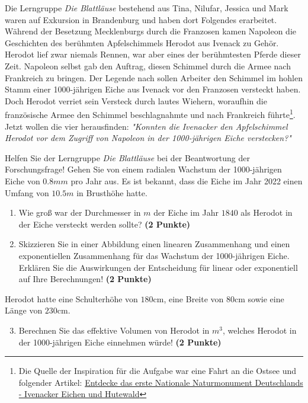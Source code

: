 \documentclass[a4paper, 9pt]{scrartcl}\usepackage[]{graphicx}\usepackage[]{xcolor}
\begin{document}
Die Lerngruppe \textit{Die Blattläuse} bestehend aus Tina, Nilufar, Jessica und Mark waren auf Exkursion in Brandenburg und haben dort Folgendes erarbeitet. Während der Besetzung Mecklenburgs durch die Franzosen kamen Napoleon die Geschichten des berühmten Apfelschimmels Herodot aus Ivenack zu Gehör. Herodot lief zwar niemals Rennen, war aber eines der berühmtesten Pferde dieser Zeit. Napoleon selbst gab den Auftrag, diesen Schimmel durch die Armee nach Frankreich zu bringen. Der Legende nach sollen Arbeiter den Schimmel im hohlen Stamm einer 1000-jährigen Eiche aus Ivenack vor den Franzosen versteckt haben. Doch Herodot verriet sein Versteck durch lautes Wiehern, woraufhin die französische Armee den Schimmel beschlagnahmte und nach Frankreich führte\footnote{Die Quelle der Inspiration  für die Aufgabe war eine Fahrt an die Ostsee und folgender Artikel:
  \href{https://www.wald-mv.de/landingpage/ivenacker-eichen/}{Entdecke das erste Nationale Naturmonument Deutschlands - Ivenacker Eichen und Hutewald}}. Jetzt wollen die vier herausfinden: \textit{"Konnten die Ivenacker den Apfelschimmel Herodot vor dem Zugriff von Napoleon in der 1000-jährigen Eiche verstecken?"} 



\vspace{1Ex}

Helfen Sie der Lerngruppe \textit{Die Blattläuse} bei der Beantwortung der Forschungsfrage! Gehen Sie von einem radialen Wachstum der 1000-jährigen Eiche von $0.8mm$ pro Jahr aus. Es ist bekannt, dass die Eiche im Jahr 2022 einen Umfang von $10.5m$ in Brusthöhe hatte.

\begin{enumerate}
\item Wie groß war der Durchmesser in $m$ der Eiche im Jahr $1840$ als Herodot in der Eiche versteckt werden sollte? \textbf{(2 Punkte)}
\item Skizzieren Sie in einer Abbildung einen linearen Zusammenhang und einen exponentiellen Zusammenhang für das Wachstum der 1000-jährigen Eiche. Erklären Sie die Auswirkungen der Entscheidung für linear oder exponentiell auf Ihre Berechnungen! \textbf{(2 Punkte)}
\end{enumerate}
 
Herodot hatte eine Schulterhöhe von $180$cm, eine Breite von $80$cm sowie eine Länge von  $230$cm.

\begin{enumerate}
  \setcounter{enumi}{2}
\item Berechnen Sie das effektive Volumen von Herodot in $m^3$, welches Herodot in der 1000-jährigen Eiche einnehmen würde! \textbf{(2 Punkte)}
\end{enumerate}
\end{document}
